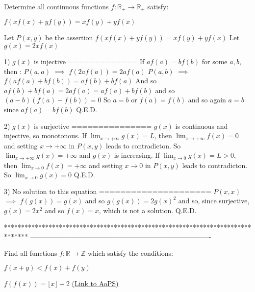 \begin{solution}
	\begin{tcolorbox}Determine all continuous functions $f:\mathbb{R}_{+}\rightarrow \mathbb{R}_{+}$ satisfy:

$f(xf(x)+yf(y))=xf(y)+yf(x)$\end{tcolorbox}
Let $P(x,y)$ be the assertion $f(xf(x)+yf(y))=xf(y)+yf(x)$
Let $g(x)=2xf(x)$

1) $g(x)$ is injective
=============
If $af(a)=bf(b)$ for some $a,b$, then :
$P(a,a)$ $\implies$ $f(2af(a))=2af(a)$
$P(a,b)$ $\implies$ $f(af(a)+bf(b))=af(b)+bf(a)$
And so $af(b)+bf(a)=2af(a)=af(a)+bf(b)$ and so $(a-b)(f(a)-f(b))=0$ 
So $a=b$ or $f(a)=f(b)$ and so again $a=b$ since $af(a)=bf(b)$
Q.E.D.

2) $g(x)$ is surjective
===============
$g(x)$ is continuous and injective, so monotonous.
If $\lim_{x\to+\infty}g(x)=L$, then $\lim_{x\to+\infty}f(x)=0$ and setting $x\to+\infty$ in $P(x,y)$ leads to contradicton.
So $\lim_{x\to+\infty}g(x)=+\infty$ and $g(x)$ is increasing.
If $\lim_{x\to 0}g(x)=L>0$, then $\lim_{x\to 0}f(x)=+\infty$ and setting $x\to 0$ in $P(x,y)$ leads to contradicton.
So $\lim_{x\to 0}g(x)=0$
Q.E.D.

3) No solution to this equation
=====================
$P(x,x)$ $\implies$ $f(g(x))=g(x)$ and so $g(g(x))=2g(x)^2$ and so, since surjective, $g(x)=2x^2$ and so $f(x)=x$, which is not a solution.
Q.E.D.
\end{solution}
*******************************************************************************
-------------------------------------------------------------------------------

\begin{problem}
	Find all functions $f : \mathbb{R} \to \mathbb{Z}$ which satisfy the conditions: 

$f(x+y) < f(x) + f(y)$

$f(f(x)) = \lfloor {x} \rfloor + 2$
	\flushright \href{https://artofproblemsolving.com/community/c6h473827}{(Link to AoPS)}
\end{problem}



